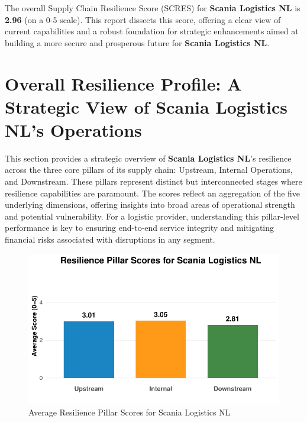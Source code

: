 \documentclass[
  oneside,
  open=any,
  fontsize=11pt]{scrbook}
\begin{document}
The overall Supply Chain Resilience Score (SCRES) for \textbf{Scania
Logistics NL} is \textbf{2.96} (on a 0-5 scale). This report dissects
this score, offering a clear view of current capabilities and a robust
foundation for strategic enhancements aimed at building a more secure
and prosperous future for \textbf{Scania Logistics NL}.

\chapter{Overall Resilience Profile: A Strategic View of Scania
Logistics NL's
Operations}\label{overall-resilience-profile-a-strategic-view-of-scania-logistics-nls-operations}

This section provides a strategic overview of \textbf{Scania Logistics
NL}'s resilience across the three core pillars of its supply chain:
Upstream, Internal Operations, and Downstream. These pillars represent
distinct but interconnected stages where resilience capabilities are
paramount. The scores reflect an aggregation of the five underlying
dimensions, offering insights into broad areas of operational strength
and potential vulnerability. For a logistic provider, understanding this
pillar-level performance is key to ensuring end-to-end service integrity
and mitigating financial risks associated with disruptions in any
segment.

\begin{figure}[H]

{\centering \includegraphics[width=1\linewidth,height=\textheight,keepaspectratio]{example_3_files/figure-pdf/pillar-scores-chart-1.pdf}

}

\caption{Average Resilience Pillar Scores for Scania Logistics NL}

\end{figure}%
\end{document}

